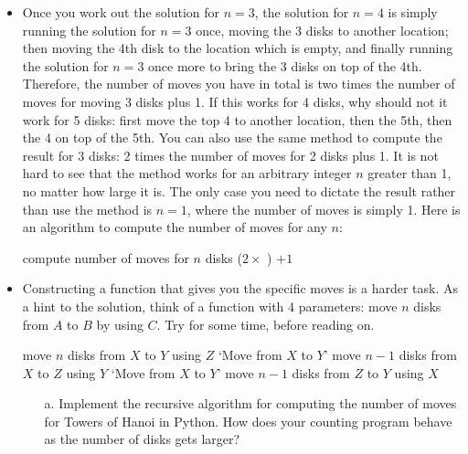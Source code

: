 \documentclass[a4paper]{article}
\begin{document}
{\begin{itemize}
\item Once you work out the solution for $n=3$, the solution for $n=4$ is simply
running the solution for $n=3$ once,  moving the 3 disks to another location;
then moving the 4th disk to the location which is empty, and finally running the
solution for $n=3$ once more to bring the 3 disks on top of the 4th. Therefore,
the number of moves you have in total is two times the number of moves for
moving 3 disks plus 1. If this works for 4 disks, why should not it work for 5
disks: first move the top 4 to another location, then the 5th, then the 4 on top
of the 5th. You can also use the same method to compute the result for 3 disks:
2 times the number of moves for 2 disks plus 1. It is not hard to see that the
method works for an arbitrary integer $n$ greater than 1, no matter how large it
is. The only case you need to dictate the result rather than use the method is
$n=1$, where the number of moves is simply 1. Here is an algorithm to compute
the number of moves for any $n$:

\begin{ucodeframe}
\hspace{1em}
\begin{algorithmic}
 \Comment compute number of moves for $n$ disks
\State{}
\Else
\State\Return ($2\times$ ) $+1$
	\EndIf
\EndFunction
\end{algorithmic}
\end{ucodeframe}

\item Constructing a function that gives you the specific moves is a harder task. 
As a hint to the solution, think of a function with 4 parameters:
move $n$ disks from $A$ to $B$ by using $C$. Try for some time, before reading
on.



\begin{ualgorithmic}
 \Comment move $n$ disks from $X$ to $Y$ using $Z$
		\State\Print `Move from $X$ to $Y$' 
	\Else
		\State{} \Comment move $n-1$ disks from $X$ to $Z$ using $Y$
		\State\Print `Move from $X$ to $Y$'
		\State{} \Comment move $n-1$ disks from $Z$ to $Y$ using $X$
	\EndIf
\EndFunction
\end{ualgorithmic}

\begin{uexercise}
\begin{itemize}
\item[]
\item[a.] Implement the recursive algorithm for computing the number of moves for Towers of Hanoi in Python. How does your counting
program behave as the number of disks gets larger?


\end{itemize}
\end{uexercise}
\end{itemize}}
\end{document}
